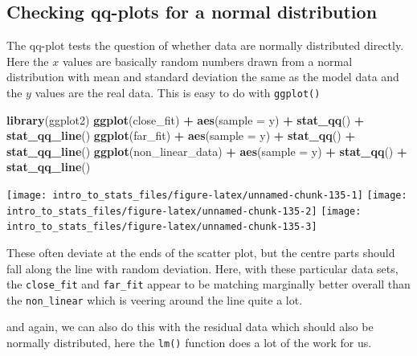 \documentclass[
]{book}
\newenvironment{Shaded}{\begin{snugshade}}{\end{snugshade}}
\newcommand{\DataTypeTok}[1]{\textcolor[rgb]{0.13,0.29,0.53}{#1}}
\newcommand{\KeywordTok}[1]{\textcolor[rgb]{0.13,0.29,0.53}{\textbf{#1}}}
\newcommand{\NormalTok}[1]{#1}
\newcommand{\OperatorTok}[1]{\textcolor[rgb]{0.81,0.36,0.00}{\textbf{#1}}}
\newcommand{\StringTok}[1]{\textcolor[rgb]{0.31,0.60,0.02}{#1}}
\begin{document}
\hypertarget{checking-qq-plots-for-a-normal-distribution}{%
\subsection{Checking qq-plots for a normal distribution}\label{checking-qq-plots-for-a-normal-distribution}}

The qq-plot tests the question of whether data are normally distributed directly. Here the \(x\) values are basically random numbers drawn from a normal distribution with mean and standard deviation the same as the model data and the \(y\) values are the real data. This is easy to do with \texttt{ggplot()}

\begin{Shaded}
\begin{Highlighting}[]
\KeywordTok{library}\NormalTok{(ggplot2)}
\KeywordTok{ggplot}\NormalTok{(close_fit) }\OperatorTok{+}\StringTok{ }\KeywordTok{aes}\NormalTok{(}\DataTypeTok{sample =}\NormalTok{ y) }\OperatorTok{+}\StringTok{ }\KeywordTok{stat_qq}\NormalTok{() }\OperatorTok{+}\StringTok{ }\KeywordTok{stat_qq_line}\NormalTok{()}
\KeywordTok{ggplot}\NormalTok{(far_fit) }\OperatorTok{+}\StringTok{ }\KeywordTok{aes}\NormalTok{(}\DataTypeTok{sample =}\NormalTok{ y) }\OperatorTok{+}\StringTok{ }\KeywordTok{stat_qq}\NormalTok{() }\OperatorTok{+}\StringTok{ }\KeywordTok{stat_qq_line}\NormalTok{()}
\KeywordTok{ggplot}\NormalTok{(non_linear_data) }\OperatorTok{+}\StringTok{ }\KeywordTok{aes}\NormalTok{(}\DataTypeTok{sample =}\NormalTok{ y) }\OperatorTok{+}\StringTok{ }\KeywordTok{stat_qq}\NormalTok{() }\OperatorTok{+}\StringTok{ }\KeywordTok{stat_qq_line}\NormalTok{()}
\end{Highlighting}
\end{Shaded}

\texttt{[image: intro\_to\_stats\_files/figure-latex/unnamed-chunk-135-1]} \texttt{[image: intro\_to\_stats\_files/figure-latex/unnamed-chunk-135-2]} \texttt{[image: intro\_to\_stats\_files/figure-latex/unnamed-chunk-135-3]}

These often deviate at the ends of the scatter plot, but the centre parts should fall along the line with random deviation. Here, with these particular data sets, the \texttt{close\_fit} and \texttt{far\_fit} appear to be matching marginally better overall than the \texttt{non\_linear} which is veering around the line quite a lot.

and again, we can also do this with the residual data which should also be normally distributed, here the \texttt{lm()} function does a lot of the work for us.
\end{document}
